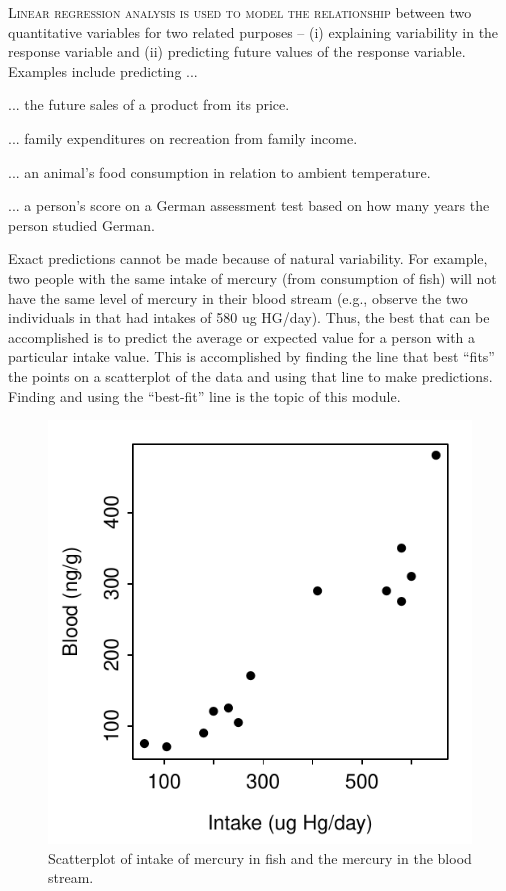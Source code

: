\documentclass[10pt,openany]{book}\usepackage[]{graphicx}\usepackage[]{color}
\newenvironment{knitrout}{}{} %
\begin{document}
\minitoc
\newpage

\lettrine{L}{inear regression analysis is used to model the relationship} between two quantitative variables for two related purposes -- (i) explaining variability in the response variable and (ii) predicting future values of the response variable.  Examples include predicting ...
\begin{Itemize}
  \item ... the future sales of a product from its price.
  \item ... family expenditures on recreation from family income.
  \item ... an animal's food consumption in relation to ambient temperature.
  \item ... a person's score on a German assessment test based on how many years the person studied German.
\end{Itemize}


Exact predictions cannot be made because of natural variability.  For example, two people with the same intake of mercury (from consumption of fish) will not have the same level of mercury in their blood stream (e.g., observe the two individuals in  that had intakes of 580 ug HG/day).  Thus, the best that can be accomplished is to predict the average or expected value for a person with a particular intake value.  This is accomplished by finding the line that best ``fits'' the points on a scatterplot of the data and using that line to make predictions.  Finding and using the ``best-fit'' line is the topic of this module.

\begin{knitrout}
\color{fgcolor}\begin{figure}[hbtp]

{\centering \includegraphics[width=.4\linewidth]{Figs/HGscat-1} 

}

\caption[Scatterplot of intake of mercury in fish and the mercury in the blood stream]{Scatterplot of intake of mercury in fish and the mercury in the blood stream.}\label{fig:HGscat}
\end{figure}


\end{knitrout}
\end{document}
